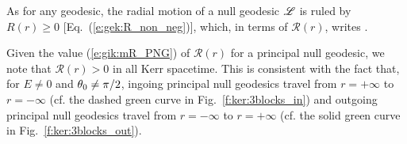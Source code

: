 As for any geodesic, the radial motion of a null geodesic $\mathscr{L}$ is ruled by
$R(r)\geq 0$ [Eq.~(\ref{e:gek:R_non_neg})], which, in terms of $\mathcal{R}(r)$,
writes
\be \label{e:mcR_non_neg}
    .
\ee

\begin{example}
Given the value (\ref{e:gik:mR_PNG}) of $\mathcal{R}(r)$ for
a principal null geodesic, we note that
$\mathcal{R}(r) > 0$ in all Kerr spacetime. This is
consistent with the fact that, for $E\neq 0$ and $\theta_0\neq\pi/2$, ingoing principal null geodesics
travel from $r=+\infty$ to $r=-\infty$ (cf. the dashed green curve
in Fig.~\ref{f:ker:3blocks_in}) and outgoing principal null geodesics
travel from $r=-\infty$ to $r=+\infty$ (cf. the solid green curve
in Fig.~\ref{f:ker:3blocks_out}).
\end{example}

